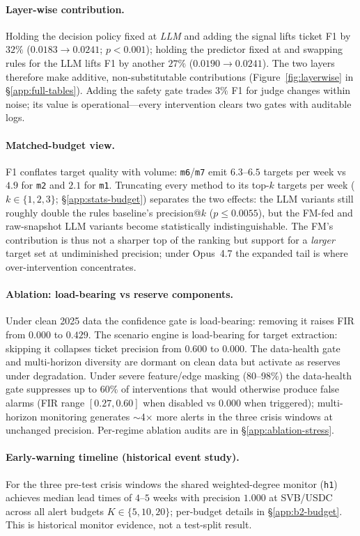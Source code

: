 \paragraph{Layer-wise contribution.}
Holding the decision policy fixed at \emph{LLM} and adding the
\fmname{} signal lifts ticket F1 by $32\%$
($0.0183\!\to\!0.0241$; $p\!<\!0.001$); holding the predictor
fixed at \fmname{} and swapping rules for the LLM lifts F1 by
another $27\%$ ($0.0190\!\to\!0.0241$). The two layers therefore
make additive, non-substitutable contributions
(Figure~\ref{fig:layerwise} in \S\ref{app:full-tables}). Adding
the safety gate trades $3\%$ F1 for judge changes within noise;
its value is operational---every intervention clears two gates
with auditable logs.

\paragraph{Matched-budget view.}
F1 conflates target quality with volume:
\texttt{m6}/\texttt{m7} emit $6.3$--$6.5$ targets per week vs
$4.9$ for \texttt{m2} and $2.1$ for \texttt{m1}. Truncating every
method to its top-$k$ targets per week ($k\!\in\!\{1,2,3\}$;
\S\ref{app:stats-budget}) separates the two effects: the LLM
variants still roughly double the rules baseline's precision@$k$
($p\!\leq\!0.0055$), but the FM-fed and raw-snapshot LLM variants
become statistically indistinguishable. The FM's contribution is
thus not a sharper top of the ranking but support for a
\emph{larger} target set at undiminished precision; under
Opus~4.7 the expanded tail is where over-intervention
concentrates.

\paragraph{Ablation: load-bearing vs reserve components.}
Under clean 2025 data the confidence gate is load-bearing: removing
it raises FIR from $0.000$ to $0.429$. The scenario engine is
load-bearing for target extraction: skipping it collapses ticket
precision from $0.600$ to $0.000$. The data-health gate and
multi-horizon diversity are dormant on clean data but activate as
reserves under degradation. Under severe feature/edge masking
(80--98\%) the data-health gate suppresses up to $60\%$ of
interventions that would otherwise produce false alarms (FIR range
$[0.27,0.60]$ when disabled vs $0.000$ when triggered);
multi-horizon monitoring generates $\sim$4$\times$ more alerts in
the three crisis windows at unchanged precision.
Per-regime ablation audits are in \S\ref{app:ablation-stress}.

\paragraph{Early-warning timeline (historical event study).}
For the three pre-test crisis windows the shared weighted-degree
monitor (\texttt{h1}) achieves median lead times of $4$--$5$
weeks with precision $1.000$ at SVB/USDC across all alert budgets
$K\!\in\!\{5,10,20\}$; per-budget details in
\S\ref{app:b2-budget}. This is historical monitor evidence, not
a test-split result.
